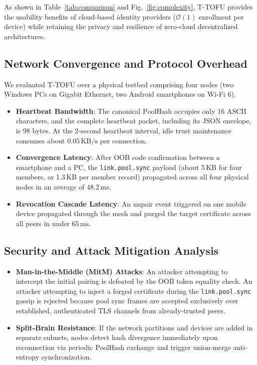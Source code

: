 \documentclass[conference,a4paper]{IEEEtran}
\begin{document}
As shown in Table~\ref{tab:comparison} and Fig.~\ref{fig:complexity}, T-TOFU provides the usability benefits of cloud-based identity providers ($\mathcal{O}(1)$ enrollment per device) while retaining the privacy and resilience of zero-cloud decentralized architectures.

\subsection{Network Convergence and Protocol Overhead}
We evaluated T-TOFU over a physical testbed comprising four nodes (two Windows PCs on Gigabit Ethernet, two Android smartphones on Wi-Fi 6).
\begin{itemize}
    \item \textbf{Heartbeat Bandwidth}: The canonical $\text{PoolHash}$ occupies only 16 ASCII characters, and the complete heartbeat packet, including its JSON envelope, is 98 bytes. At the 2-second heartbeat interval, idle trust maintenance consumes about $0.05\,\text{KB/s}$ per connection.
    \item \textbf{Convergence Latency}: After OOB code confirmation between a smartphone and a PC, the \texttt{link.pool.sync} payload (about 5\,KB for four members, or 1.3\,KB per member record) propagated across all four physical nodes in an average of $48.2\,\text{ms}$.
    \item \textbf{Revocation Cascade Latency}: An unpair event triggered on one mobile device propagated through the mesh and purged the target certificate across all peers in under $65\,\text{ms}$.
\end{itemize}

\subsection{Security and Attack Mitigation Analysis}
\begin{itemize}
    \item \textbf{Man-in-the-Middle (MitM) Attacks}: An attacker attempting to intercept the initial pairing is defeated by the OOB token equality check. An attacker attempting to inject a forged certificate during the \texttt{link.pool.sync} gossip is rejected because pool sync frames are accepted exclusively over established, authenticated TLS channels from already-trusted peers.
    \item \textbf{Split-Brain Resistance}: If the network partitions and devices are added in separate subnets, nodes detect hash divergence immediately upon reconnection via periodic $\text{PoolHash}$ exchange and trigger union-merge anti-entropy synchronization.
\end{itemize}
\end{document}
